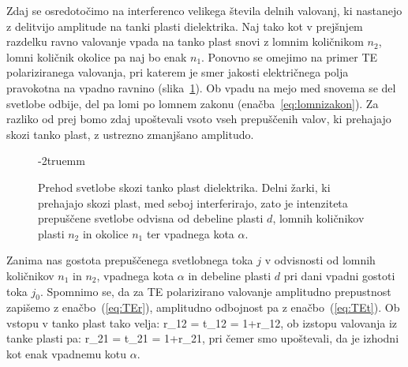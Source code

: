 Zdaj se osredotočimo na interferenco velikega števila delnih 
valovanj, ki nastanejo z delitvijo amplitude na tanki plasti dielektrika.
Naj tako kot v prejšnjem razdelku ravno valovanje vpada na tanko plast 
snovi z lomnim količnikom $n_2$, lomni količnik okolice pa naj bo enak $n_1$. 
Ponovno se omejimo na primer TE polariziranega valovanja, pri katerem
je smer jakosti električnega polja pravokotna na vpadno ravnino 
(slika~\ref{fig:06_plastmulti}). Ob vpadu na mejo med snovema se del 
svetlobe odbije, del pa lomi po lomnem zakonu (enačba~\ref{eq:lomnizakon}).
Za razliko od prej bomo zdaj upoštevali vsoto vseh prepuščenih valov, 
ki prehajajo skozi tanko plast, z ustrezno zmanjšano amplitudo.
\begin{figure}[ht]
\centering
\def\svgwidth{70truemm} 

\caption{Prehod svetlobe skozi tanko plast dielektrika. Delni žarki, ki prehajajo
skozi plast, med seboj interferirajo, zato je intenziteta prepuščene svetlobe odvisna
od debeline plasti $d$, lomnih količnikov plasti $n_2$ in okolice $n_1$ ter vpadnega 
kota $\alpha$. }
\vglue-2truemm
\label{fig:06_plastmulti}
\end{figure}

Zanima nas gostota prepuščenega svetlobnega toka $j$ v odvisnosti od 
lomnih količnikov $n_1$ in $n_2$, vpadnega kota $\alpha$ in debeline plasti $d$ pri dani
vpadni gostoti toka $j_0$. Spomnimo se, da za TE polarizirano valovanje
amplitudno prepustnost zapišemo z enačbo~(\ref{eq:TEr}), amplitudno odbojnost
pa z enačbo~(\ref{eq:TEt}). Ob vstopu v tanko plast tako velja:
\beq
r_{12} = \qquad 
{}\qquad t_{12} = 1+r_{12},
\label{eq:06_35}
\eeq
ob izstopu valovanja iz tanke plasti pa:
\beq
r_{21} = \qquad 
{}\qquad t_{21} = 1+r_{21},
\label{eq:06_36}
\eeq
pri čemer smo upoštevali, da je izhodni kot enak vpadnemu kotu $\alpha$. 

